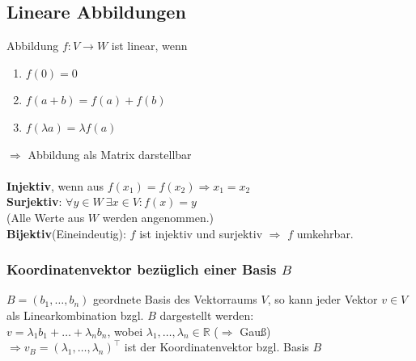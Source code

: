\documentclass[6pt,a4paper]{scrartcl}
\begin{document}
\begin{multicols*}{4}
\subsection{Lineare Abbildungen}
Abbildung $f:V\rightarrow W$ ist linear, wenn
\begin{enumerate}\itemsep0pt
\item $f(0)=0$
\item $f(a+b)=f(a)+f(b)$
\item $f(\lambda a)=\lambda f(a)$
\end{enumerate}
$\Rightarrow$ Abbildung als Matrix darstellbar\\ \\
\textbf{Injektiv}, wenn aus $f(x_1)=f(x_2) \Rightarrow x_1=x_2$\\
\textbf{Surjektiv}: $\forall y\in W \ \exists x\in V:f(x)=y$\\ \quad (Alle Werte aus $W$ werden angenommen.)\\
\textbf{Bijektiv}(Eineindeutig): $f$ ist injektiv und surjektiv $\Rightarrow$ $f$ umkehrbar.
\subsubsection{Koordinatenvektor bezüglich einer Basis $B$}
$B=(b_1,\dots,b_n)$ geordnete Basis des Vektorraums $V$, so kann jeder Vektor $v\in V$ als Linearkombination bzgl. $B$ dargestellt werden: \\
$v=\lambda_1b_1+\dots+\lambda_nb_n$, wobei $\lambda_1,\dots,\lambda_n\in \mathbb{R}$ ($\Rightarrow$ Gauß)\\
$\Rightarrow v_B=(\lambda_1, \dots ,\lambda_n)^\top$ ist der Koordinatenvektor bzgl. Basis $B$

\end{multicols*}
\end{document}
